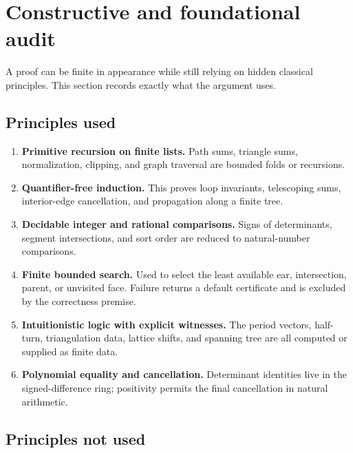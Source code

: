 \section{Constructive and foundational audit}
\label{sec:audit}

A proof can be finite in appearance while still relying on hidden classical principles.  This section records exactly what the argument uses.

\subsection{Principles used}

\begin{enumerate}[label=(\arabic*)]
\item \textbf{Primitive recursion on finite lists.}  Path sums, triangle sums, normalization, clipping, and graph traversal are bounded folds or recursions.
\item \textbf{Quantifier-free induction.}  This proves loop invariants, telescoping sums, interior-edge cancellation, and propagation along a finite tree.
\item \textbf{Decidable integer and rational comparisons.}  Signs of determinants, segment intersections, and sort order are reduced to natural-number comparisons.
\item \textbf{Finite bounded search.}  Used to select the least available ear, intersection, parent, or unvisited face.  Failure returns a default certificate and is excluded by the correctness premise.
\item \textbf{Intuitionistic logic with explicit witnesses.}  The period vectors, half-turn, triangulation data, lattice shifts, and spanning tree are all computed or supplied as finite data.
\item \textbf{Polynomial equality and cancellation.}  Determinant identities live in the signed-difference ring; positivity permits the final cancellation in natural arithmetic.
\end{enumerate}

\subsection{Principles not used}

